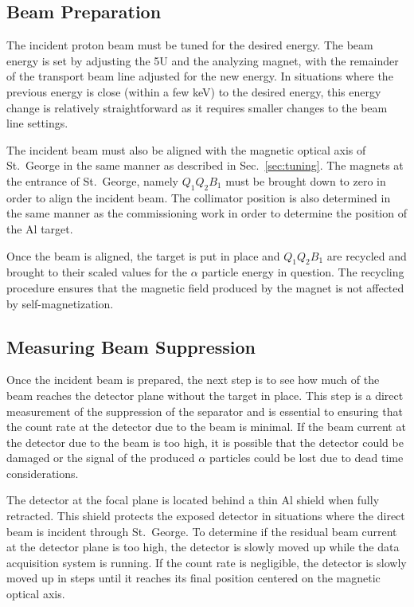 \subsection{Beam Preparation}

The incident proton beam must be tuned for the desired energy. The beam
energy is set by adjusting the 5U and the analyzing magnet, with the
remainder of the transport beam line adjusted for the new energy. In
situations where the previous energy is close (within a few keV) to the
desired energy, this energy change is relatively straightforward as it
requires smaller changes to the beam line settings.

The incident beam must also be aligned with the magnetic optical axis of
St.\ George in the same manner as described in Sec.~\ref{sec:tuning}.
The magnets at the entrance of St.\ George, namely $Q_1Q_2B_1$ must be
brought down to zero in order to align the incident beam. The collimator
position is also determined in the same manner as the commissioning work
in order to determine the position of the Al target.

Once the beam is aligned, the target is put in place and $Q_1Q_2B_1$ are
recycled and brought to their scaled values for the $\alpha$ particle
energy in question. The recycling procedure ensures that the magnetic
field produced by the magnet is not affected by self-magnetization.

\subsection{Measuring Beam Suppression}

Once the incident beam is prepared, the next step is to see how much of
the beam reaches the detector plane without the target in place. This
step is a direct measurement of the suppression of the separator and is
essential to ensuring that the count rate at the detector due to the
beam is minimal. If the beam current at the detector due to the beam is
too high, it is possible that the detector could be damaged or the
signal of the produced $\alpha$ particles could be lost due to dead time
considerations.

The detector at the focal plane is located behind a thin Al shield when
fully retracted. This shield protects the exposed detector in situations
where the direct beam is incident through St.\ George. To determine if
the residual beam current at the detector plane is too high, the
detector is slowly moved up while the data acquisition system is
running. If the count rate is negligible, the detector is slowly moved
up in steps until it reaches its final position centered on the magnetic
optical axis.

